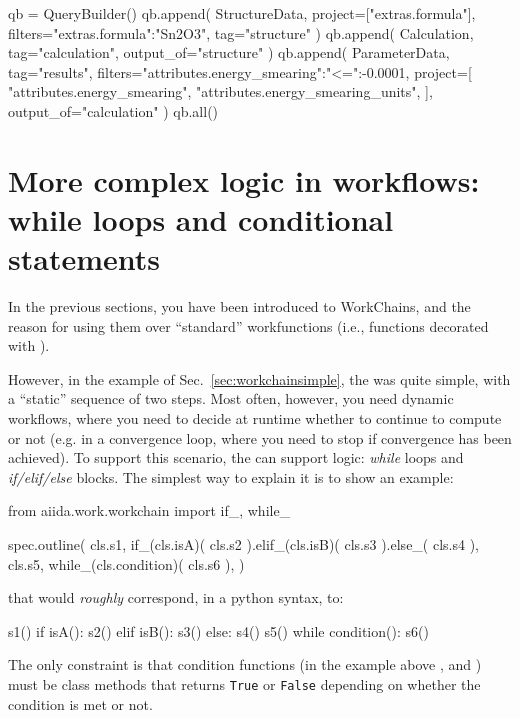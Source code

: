 \begin{pythoncommand}
qb = QueryBuilder()
qb.append(
        StructureData,
        project=["extras.formula"],
        filters={"extras.formula":"Sn2O3"},
        tag="structure"
    )
qb.append(
        Calculation,
        tag="calculation",
        output_of="structure"
    )
qb.append(
        ParameterData,
        tag="results",
        filters={"attributes.energy_smearing":{"<=":-0.0001}},
        project=[
            "attributes.energy_smearing",
            "attributes.energy_smearing_units",
        ],
        output_of="calculation"
)
qb.all()
\end{pythoncommand}

\section{\label{sec:convpressure}More complex logic in workflows: while loops and conditional statements}
In the previous sections, you have been introduced to WorkChains, and the reason for using them over ``standard'' workfunctions (i.e., functions decorated with ).

However, in the example of Sec.~\ref{sec:workchainsimple}, the  was quite simple, with a ``static'' sequence of two steps.
Most often, however, you need dynamic workflows, where you need to decide at runtime whether to continue to compute or not (e.g. in a convergence loop, where you need to stop if convergence has been achieved).
To support this scenario, the  can support logic: \emph{while} loops and \emph{if/elif/else} blocks.
The simplest way to explain it is to show an example:
\begin{pythoncommand}
from aiida.work.workchain import if_, while_

spec.outline(
    cls.s1,
    if_(cls.isA)(
        cls.s2
    ).elif_(cls.isB)(
        cls.s3
    ).else_(
        cls.s4
    ),
    cls.s5,
    while_(cls.condition)(
        cls.s6
    ),
)
\end{pythoncommand}
that would \emph{roughly} correspond, in a python syntax, to:
\begin{pythoncommand}
s1()
if isA():
    s2()
elif isB():
    s3()
else:
    s4()
s5()
while condition():
    s6()
\end{pythoncommand}
The only constraint is that condition functions (in the example above ,  and ) must be class methods that returns \texttt{True} or \texttt{False} depending on whether the condition is met or not.

